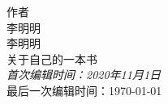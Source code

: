 \begin{titlepage}
  \raggedleft
  {\Large 作者\\ 李明明\\[1in] }
  {\Huge\scshape 李明明\\[.2in]}
  {\large 关于自己的一本书\\}
  \vfill
  {\itshape 首次编辑时间：2020年11月1日\\}
  最后一次编辑时间：\today
  
\end{titlepage}

